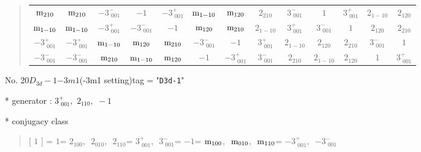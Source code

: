 \documentclass[fleqn,10pt,landscape]{jsarticle}
\begin{document}
\begin{quote}
\begin{tabular}{ccccccccccccc}
$ {\rm m}_{210} $ & $ {\rm m}_{210} $ & $ -3^{-}_{\,\,001} $ & $ -1 $ & $ -3^{+}_{\,\,001} $ & $ {\rm m}_{1-10} $ & $ {\rm m}_{120} $ & $ 2{}_{210} $ & $ 3^{-}_{\,\,001} $ & $ 1 $ & $ 3^{+}_{\,\,001} $ & $ 2{}_{1-10} $ & $ 2{}_{120} $ \\
$ {\rm m}_{1-10} $ & $ {\rm m}_{1-10} $ & $ -3^{+}_{\,\,001} $ & $ -3^{-}_{\,\,001} $ & $ -1 $ & $ {\rm m}_{120} $ & $ {\rm m}_{210} $ & $ 2{}_{1-10} $ & $ 3^{+}_{\,\,001} $ & $ 3^{-}_{\,\,001} $ & $ 1 $ & $ 2{}_{120} $ & $ 2{}_{210} $ \\
$ -3^{+}_{\,\,001} $ & $ -3^{+}_{\,\,001} $ & $ {\rm m}_{1-10} $ & $ {\rm m}_{120} $ & $ {\rm m}_{210} $ & $ -3^{-}_{\,\,001} $ & $ -1 $ & $ 3^{+}_{\,\,001} $ & $ 2{}_{1-10} $ & $ 2{}_{120} $ & $ 2{}_{210} $ & $ 3^{-}_{\,\,001} $ & $ 1 $ \\
$ -3^{-}_{\,\,001} $ & $ -3^{-}_{\,\,001} $ & $ {\rm m}_{210} $ & $ {\rm m}_{1-10} $ & $ {\rm m}_{120} $ & $ -1 $ & $ -3^{+}_{\,\,001} $ & $ 3^{-}_{\,\,001} $ & $ 2{}_{210} $ & $ 2{}_{1-10} $ & $ 2{}_{120} $ & $ 1 $ & $ 3^{+}_{\,\,001} $ \\
 \hline \hline
\end{tabular}
\end{quote}

\newpage

No. 20\quad$D_{3d}-1$\quad$-3m1$\quad(-3m1 setting)\quad[ trigonal ]
tag = "{\tt D3d-1}"

* generator : $3^{+}_{\,\,001},\,\,2{}_{110},\,\,-1$

* conjugacy class
\begin{quote}
[ $1$ ] = \quad $1$\newline[ $2{}_{100}$ ] = \quad $2{}_{100}$,\,\, $2{}_{010}$,\,\, $2{}_{110}$\newline[ $3^{+}_{\,\,001}$ ] = \quad $3^{+}_{\,\,001}$,\,\, $3^{-}_{\,\,001}$\newline[ $-1$ ] = \quad $-1$\newline[ ${\rm m}_{100}$ ] = \quad ${\rm m}_{100}$,\,\, ${\rm m}_{010}$,\,\, ${\rm m}_{110}$\newline[ $-3^{+}_{\,\,001}$ ] = \quad $-3^{+}_{\,\,001}$,\,\, $-3^{-}_{\,\,001}$\newline
\end{quote}
\end{document}
